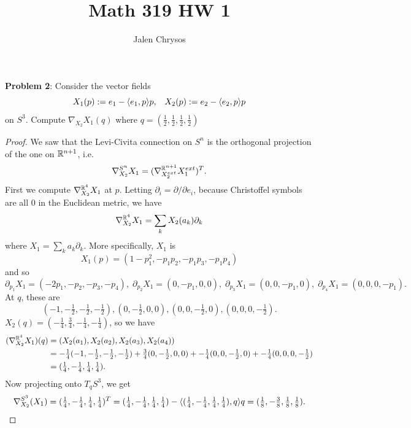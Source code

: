 \documentclass{amsart}
\title{Math 319 HW 1}
\author{Jalen Chrysos}
\begin{document}
	\maketitle 
	
	\textbf{Problem 2}: Consider the vector fields
	$$X_1(p) := e_1 - \langle e_1,p\rangle p, \;\;\; X_2(p) := e_2 - \langle e_2,p\rangle p$$
	on $S^3$. Compute $\nabla_{X_2}X_1(q)$ where $q=(\tfrac12,\tfrac12,\tfrac12,\tfrac12)$
	\begin{proof}
		We saw that the Levi-Civita connection on $S^n$ is the orthogonal projection of the one on $\mathbb{R}^{n+1}$, i.e.
		$$
		\nabla^{S^n}_{X_2}X_1 = (\nabla^{\mathbb{R}^{n+1}}_{X_2^{ext}}X_1^{ext})^T.
		$$
		First we compute $\nabla^{\mathbb{R}^4}_{X_2}X_1$ at $p$. Letting $\partial_i = \partial/\partial e_i$, because Christoffel symbols are all 0 in the Euclidean metric, we have
		$$
		\nabla^{\mathbb{R}^4}_{X_2}X_1 = \sum_k X_2(a_k) \partial_k
		$$
		where $X_1 = \sum_k a_k \partial_k$. More specifically, $X_1$ is
		$$
		X_1(p) = (1 - p_1^2,-p_1p_2, -p_1p_3, -p_1p_4)
		$$ 
		and so
		$$
		\partial_{p_1} X_1 = (-2p_1,-p_2,-p_3,-p_4), \; \partial_{p_2} X_1 = (0,-p_1,0,0), \; \partial_{p_3} X_1 = (0,0,-p_1,0),\;  \partial_{p_4} X_1 = (0,0,0,-p_1).
		$$
		At $q$, these are
		$$
		(-1,-\tfrac12,-\tfrac12,-\tfrac12), (0,-\tfrac12,0,0),(0,0,-\tfrac12,0),(0,0,0,-\tfrac12).
		$$
		$X_2(q)=(-\tfrac14,\tfrac34,-\tfrac14,-\tfrac14)$, so we have
		\begin{align*}
		(\nabla_{X_2}^{\mathbb{R}^4} X_1)(q) &= (X_2(a_1),X_2(a_2),X_2(a_3),X_2(a_4))\\
		 &=  -\tfrac14 (-1,-\tfrac12,-\tfrac12,-\tfrac12) + \tfrac34(0,-\tfrac12,0,0) + -\tfrac14(0,0,-\tfrac12,0) + -\tfrac14(0,0,0,-\tfrac12)\\
		 &= (\tfrac14,-\tfrac14,\tfrac14,\tfrac14).
		\end{align*}
		Now projecting onto $T_qS^3$, we get
		$$
		\nabla_{X_2}^{S^3}(X_1) = (\tfrac14,-\tfrac14,\tfrac14,\tfrac14)^T = (\tfrac14,-\tfrac14,\tfrac14,\tfrac14) - \langle(\tfrac14,-\tfrac14,\tfrac14,\tfrac14),q\rangle q = (\tfrac18,-\tfrac38,\tfrac18,\tfrac18).
		$$
	\end{proof}\\
	
	
	\newpage 
	
\end{document}

